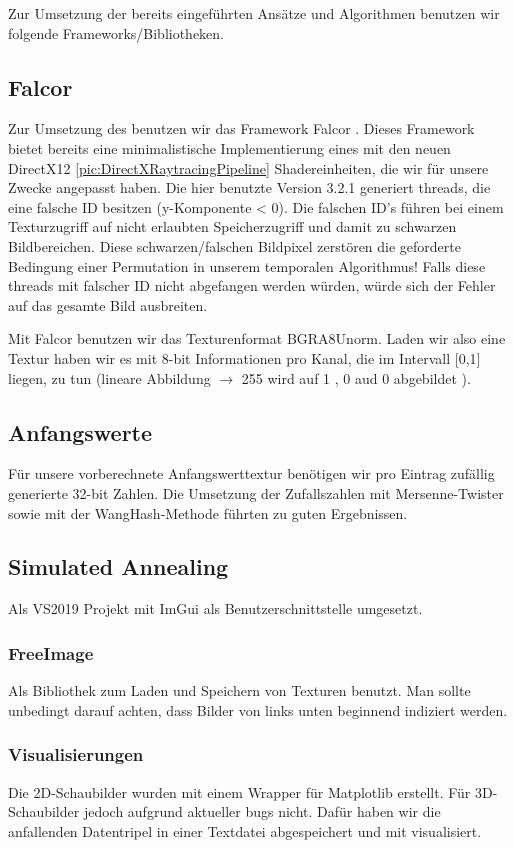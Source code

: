 Zur Umsetzung der bereits eingeführten Ansätze und Algorithmen benutzen wir folgende Frameworks/Bibliotheken. 

\subsection{Falcor}

Zur Umsetzung des  benutzen wir das Framework Falcor \cite{Benty18}. Dieses Framework bietet bereits eine minimalistische Implementierung 
eines  mit den neuen DirectX12 \ref{pic:DirectXRaytracingPipeline} Shadereinheiten, die wir für unsere Zwecke angepasst haben. 
Die hier benutzte Version 3.2.1 generiert threads, die eine falsche ID besitzen (y-Komponente < 0). Die falschen ID's führen bei einem Texturzugriff auf nicht erlaubten
Speicherzugriff und damit zu schwarzen Bildbereichen. Diese schwarzen/falschen Bildpixel zerstören die geforderte Bedingung einer Permutation in unserem temporalen Algorithmus! 
Falls diese threads mit falscher ID nicht abgefangen werden würden, würde sich der Fehler auf das gesamte Bild ausbreiten.\par
Mit Falcor benutzen wir das Texturenformat BGRA8Unorm. Laden wir also eine Textur haben wir es mit 8-bit Informationen pro Kanal, die im Intervall [0,1] liegen, zu tun (lineare
Abbildung $\rightarrow$ 255 wird auf 1 , 0 aud 0 abgebildet \cite{ImageFormat}).

\subsection{Anfangswerte}
Für unsere vorberechnete Anfangswerttextur benötigen wir pro Eintrag zufällig generierte 32-bit Zahlen. Die Umsetzung der Zufallszahlen mit Mersenne-Twister \cite{MersenneTwister}
sowie mit der WangHash-Methode \cite{wanghash} führten zu guten Ergebnissen.

\subsection{Simulated Annealing}
Als VS2019 Projekt mit ImGui \cite{Imgui} als Benutzerschnittstelle umgesetzt.

\subsubsection{FreeImage}
Als Bibliothek \cite{FreeImage} zum Laden und Speichern von Texturen benutzt. Man sollte unbedingt darauf achten, dass Bilder von links unten beginnend 
indiziert werden.

\subsubsection{Visualisierungen}
Die 2D-Schaubilder wurden mit einem Wrapper für Matplotlib \cite{matplotlibwrapper} erstellt. Für 3D-Schaubilder jedoch aufgrund aktueller bugs nicht.
Dafür haben wir die anfallenden Datentripel in einer Textdatei abgespeichert und mit \cite{gnuplot} visualisiert. 